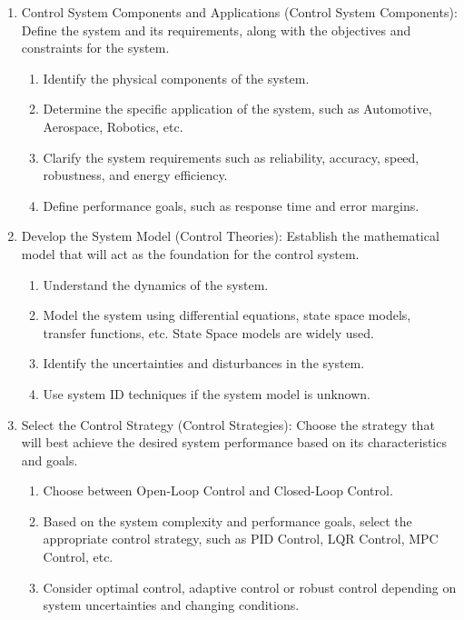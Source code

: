 \documentclass{article}
\begin{document}
\begin{enumerate}
    \item Control System Components and Applications (Control System Components): Define the system and its requirements, along with the objectives and constraints for the system.
        \begin{enumerate}[label=\roman*.]
            \item Identify the physical components of the system.
            \item Determine the specific application of the system, such as Automotive, Aerospace, Robotics, etc.
            \item Clarify the system requirements such as reliability, accuracy, speed, robustness, and energy efficiency.
            \item Define performance goals, such as response time and error margins.
        \end{enumerate}
    \item Develop the System Model (Control Theories): Establish the mathematical model that will act as the foundation for the control system.
        \begin{enumerate}[label=\roman*.]
            \item Understand the dynamics of the system.
            \item Model the system using differential equations, state space models, transfer functions, etc. State Space models are widely used.
            \item Identify the uncertainties and disturbances in the system.
            \item Use system ID techniques if the system model is unknown.
        \end{enumerate}
    \item Select the Control Strategy (Control Strategies): Choose the strategy that will best achieve the desired system performance based on its characteristics and goals.
        \begin{enumerate}[label=\roman*.]
            \item Choose between Open-Loop Control and Closed-Loop Control.
            \item Based on the system complexity and performance goals, select the appropriate control strategy, such as PID Control, LQR Control, MPC Control, etc.
            \item Consider optimal control, adaptive control or robust control depending on system uncertainties and changing conditions.

\end{enumerate}
\end{enumerate}
\end{document}
